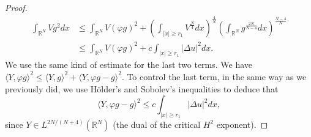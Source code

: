 \documentclass[a4paper,two-side,10pt]{amsart}
\newcommand{\R}{\mathbb{R}}
\numberwithin{equation}{section}
\begin{document}
\begin{proof}
\begin{align*}
\int_{\R^N} V g^2 dx& \leq  \int_{\R^N} V (\varphi g)^2 + \left(\int_{|x|\geq r_1} V^{\frac{N}{4}}dx \right)^{\frac{4}{N}}   \left(\int_{\R^N}  g^{\frac{2N}{N-4}} dx\right)^\frac{N-4}{N}\\
&\leq   \int_{\R^N} V (\varphi g)^2 + c \int_{|x|\geq r_1} |\Delta u|^2 dx .
\end{align*}
We use the same kind of estimate for the last two terms. We have $\langle  Y , \varphi g\rangle^2 \leq \langle  Y , g\rangle^2 + \langle  Y , \varphi g -g \rangle^2$. To control the last term, in the same way as we previously did, we use H\" older's and Sobolev's inequalities to deduce that
$$\langle  Y , \varphi g -g \rangle^2 \leq  c \int_{|x|\geq r_1} |\Delta u|^2 dx  ,$$
 since $Y\in L^{2N/(N+4)}(\R^N)$ (the dual of the critical $H^2$ exponent).
\end{proof} 
\end{document}

